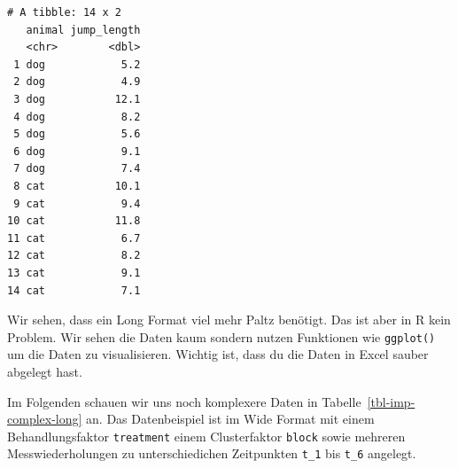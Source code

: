 \documentclass[
  letterpaper,
  DIV=11,
  oneside]{scrreport}
\begin{document}
\begin{verbatim}
# A tibble: 14 x 2
   animal jump_length
   <chr>        <dbl>
 1 dog            5.2
 2 dog            4.9
 3 dog           12.1
 4 dog            8.2
 5 dog            5.6
 6 dog            9.1
 7 dog            7.4
 8 cat           10.1
 9 cat            9.4
10 cat           11.8
11 cat            6.7
12 cat            8.2
13 cat            9.1
14 cat            7.1
\end{verbatim}

Wir sehen, dass ein Long Format viel mehr Paltz benötigt. Das ist aber
in R kein Problem. Wir sehen die Daten kaum sondern nutzen Funktionen
wie \texttt{ggplot()} um die Daten zu visualisieren. Wichtig ist, dass
du die Daten in Excel sauber abgelegt hast.

Im Folgenden schauen wir uns noch komplexere Daten in
Tabelle~\ref{tbl-imp-complex-long} an. Das Datenbeispiel ist im Wide
Format mit einem Behandlungsfaktor \texttt{treatment} einem
Clusterfaktor \texttt{block} sowie mehreren Messwiederholungen zu
unterschiedichen Zeitpunkten \texttt{t\_1} bis \texttt{t\_6} angelegt.
\end{document}

